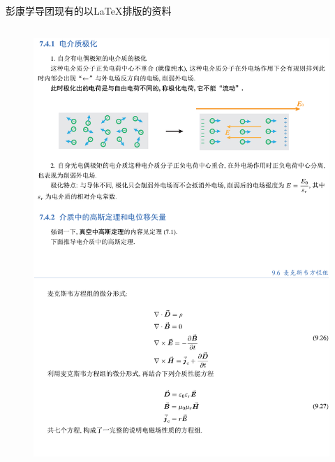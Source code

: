 \begin{frame}{彭康学导团现有的以\LaTeX 排版的资料}
\begin{itemize}
\begin{columns}
\begin{column}{0.48\textwidth}
\begin{figure}
                    \centering
                    \includegraphics[scale=0.2]{figures/PK_DW2.pdf}
                \end{figure}
            \end{column}
        \end{columns}
    \end{itemize}
\end{frame}

